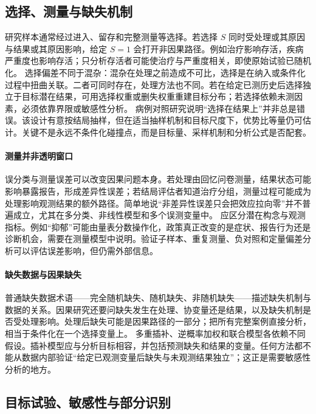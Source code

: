 \subsection{选择、测量与缺失机制}

研究样本通常经过进入、留存和完整测量等选择。若选择 $S$ 同时受处理或其原因与结果或其原因影响，给定 $S=1$ 会打开非因果路径。例如治疗影响存活，疾病严重度也影响存活；只分析存活者可能使治疗与严重度相关，即使原始试验已随机化。
选择偏差不同于混杂：混杂在处理之前造成不可比，选择是在纳入或条件化过程中扭曲关联。二者可同时存在，处理方法也不同。若在给定已测历史后选择独立于目标潜在结果，可用选择权重或删失权重重建目标分布；若选择依赖未测因素，必须依靠界限或敏感性分析。
病例对照研究说明“选择在结果上”并非总是错误。该设计有意按结局抽样，但在适当抽样机制和目标尺度下，优势比等量仍可估计。关键不是永远不条件化碰撞点，而是目标量、采样机制和分析公式是否配套。

\paragraph{测量并非透明窗口}

误分类与测量误差可以改变因果问题本身。若处理由回忆问卷测量，结果状态可能影响暴露报告，形成差异性误差；若结局评估者知道治疗分组，测量过程可能成为处理影响观测结果的额外路径。简单地说“非差异性误差只会把效应拉向零”并不普遍成立，尤其在多分类、非线性模型和多个误测变量中。
应区分潜在构念与观测指标。例如“抑郁”可能由量表分数操作化，政策真正改变的是症状、报告行为还是诊断机会，需要在测量模型中说明。验证子样本、重复测量、负对照和定量偏差分析可以评估误差影响，但仍需外部信息。

\paragraph{缺失数据与因果缺失}

普通缺失数据术语------完全随机缺失、随机缺失、非随机缺失------描述缺失机制与数据的关系。因果研究还要问缺失发生在处理、协变量还是结果，以及缺失机制是否受处理影响。处理后缺失可能是因果路径的一部分；把所有完整案例直接分析，相当于条件化在一个选择变量上。
多重插补、逆概率加权和联合模型各依赖不同假设。插补模型应与分析目标相容，并包括预测缺失和结果的变量。任何方法都不能从数据内部验证“给定已观测变量后缺失与未观测结果独立”；这正是需要敏感性分析的地方。

\subsection{目标试验、敏感性与部分识别}

